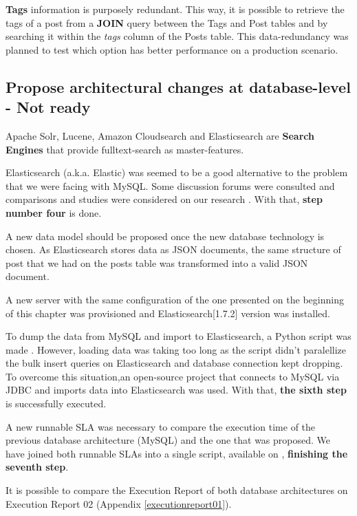 \textbf{Tags} information is purposely redundant. This way, it is possible to retrieve the tags of a post from a \textbf{JOIN} query between the Tags and Post tables and by searching it within the \textit{tags} column of the Posts table. This data-redundancy was planned to test which option has better performance on a production scenario.  


\subsection{Propose architectural changes at database-level - Not ready}

Apache Solr, Lucene, Amazon Cloudsearch and Elasticsearch are \textbf{Search Engines} that provide fulltext-search as master-features. 

Elasticsearch (a.k.a. Elastic) was seemed to be a good alternative to the problem that we were facing with MySQL. Some discussion forums were consulted and comparisons and studies were considered on our research \cite{StackOverflowElastic} \cite{SolrVsES} \cite{quoraES}. With that, \textbf{step number four} is done. 

A new data model should be proposed once the new database technology is chosen. As Elasticsearch stores data as JSON documents, the same structure of post that we had on the posts table was transformed into a valid JSON document.

A new server with the same configuration of the one presented on the beginning of this chapter was provisioned and Elasticsearch[1.7.2] version was installed.

To dump the data from MySQL and import to Elasticsearch, a Python script was made \cite{mysqltoes}. However, loading data was taking too long as the script didn't paralellize the bulk insert queries on Elasticsearch and database connection kept dropping. To overcome this situation,an open-source project that connects to MySQL via JDBC and imports data into Elasticsearch \cite{elasticjdbc} was used. 
With that, \textbf{the sixth step} is successfully executed. 

A new runnable SLA was necessary to compare the execution time of the previous database architecture (MySQL) and the one that was proposed. We have joined both runnable SLAs into a single script, available on \cite{runnablesla01}, \textbf{finishing the seventh step}.

It is possible to compare the Execution Report of both database architectures on Execution Report 02 (Appendix \ref{executionreport01}).

